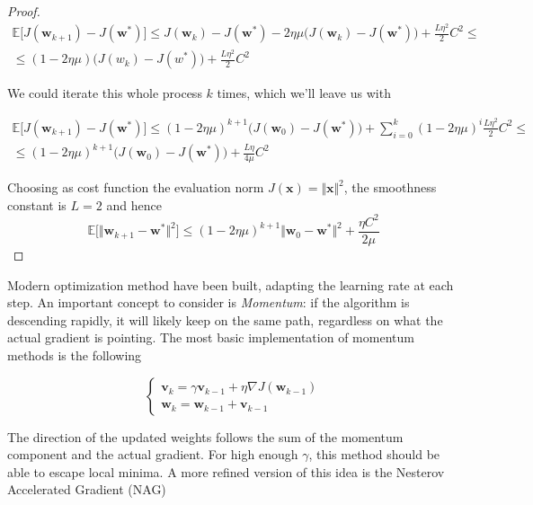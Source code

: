 \documentclass{article}
\numberwithin{equation}{subsection}
\begin{document}
\begin{proof}
    \begin{gather*}
        \mathbb{E}\big[ J(\textbf{w}_{k+1}) - J(\textbf{w}^*) \big] \leq J(\textbf{w}_k) - J(\textbf{w}^*) - 2\eta\mu \big( J(\textbf{w}_k) - J(\textbf{w}^*) \big) + \frac{L\eta^2}{2}C^2 \leq \\
        \leq (1-2\eta \mu)\big( J(w_k) - J(w^*) \big) + \frac{L\eta^2}{2}C^2
    \end{gather*}

    We could iterate this whole process $k$ times, which we'll leave us with

    \begin{gather*}
        \mathbb{E}\big[ J(\textbf{w}_{k+1}) - J(\textbf{w}^*) \big] \leq (1-2\eta\mu)^{k+1} \big( J(\textbf{w}_0)-J(\textbf{w}^*) \big) + \sum_{i=0}^k (1-2\eta\mu)^i \frac{L\eta^2}{2}C^2 \leq \\
        \leq (1-2\eta\mu)^{k+1} \big( J(\textbf{w}_0)-J(\textbf{w}^*) \big) +\frac{L\eta}{4\mu}C^2
    \end{gather*}

    Choosing as cost function the evaluation norm $J(\textbf{x}) = \Vert \textbf{x} \Vert^2$, the smoothness constant is $L = 2$ and hence 
    \begin{equation*}
        \mathbb{E}\big[ \Vert \textbf{w}_{k+1} - \textbf{w}^* \Vert^2 \big] \leq (1-2\eta \mu)^{k+1} \Vert \textbf{w}_0 - \textbf{w}^* \Vert^2 + \frac{\eta C^2}{2\mu}
     \end{equation*}
\end{proof}

Modern optimization method have been built, adapting the learning rate at each step. An important concept to consider is \textit{Momentum}: if the algorithm is descending rapidly, it will likely keep on the same path, regardless on what the actual gradient is pointing. The most basic implementation of momentum methods is the following

\begin{equation}
    \begin{cases}
        \textbf{v}_k = \gamma \textbf{v}_{k-1} + \eta \nabla J(\textbf{w}_{k-1}) \\
        \textbf{w}_k = \textbf{w}_{k-1}+\textbf{v}_{k-1}
    \end{cases}
\end{equation}

The direction of the updated weights follows the sum of the momentum component and the actual gradient. For high enough $\gamma$, this method should be able to escape local minima. A more refined version of this idea is the Nesterov Accelerated Gradient (NAG)
\end{document}
